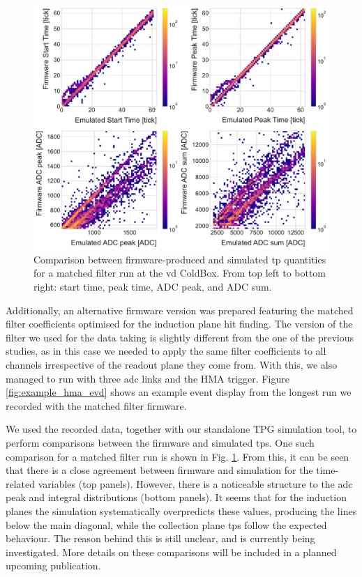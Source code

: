 \begin{figure}[t]
    \centering
    \includegraphics[scale = 0.5]{Images/Matched_Filter/np02_coldbox_tp_comp.pdf}
    \caption[Comparison between firmware-produced and simulated \gls{tp} quantities for a matched filter run at the \gls{vd} ColdBox.]{Comparison between firmware-produced and simulated \gls{tp} quantities for a matched filter run at the \gls{vd} ColdBox. From top left to bottom right: start time, peak time, ADC peak, and ADC sum.}
    \label{fig:vdcoldbox_tp_comp}
\end{figure}

Additionally, an alternative firmware version was prepared featuring the matched filter coefficients optimised for the induction plane hit finding. The version of the filter we used for the data taking is slightly different from the one of the previous studies, as in this case we needed to apply the same filter coefficients to all channels irrespective of the readout plane they come from. With this, we also managed to run with three \gls{adc} links and the HMA trigger. Figure \ref{fig:example_hma_evd} shows an example event display from the longest run we recorded with the matched filter firmware.

We used the recorded data, together with our standalone TPG simulation tool, to perform comparisons between the firmware and simulated \gls{tp}s. One such comparison for a matched filter run is shown in Fig. \ref{fig:vdcoldbox_tp_comp}. From this, it can be seen that there is a close agreement between firmware and simulation for the time-related variables (top panels). However, there is a noticeable structure to the \gls{adc} peak and integral distributions (bottom panels). It seems that for the induction planes the simulation systematically overpredicts these values, producing the lines below the main diagonal, while the collection plane \gls{tp}s follow the expected behaviour. The reason behind this is still unclear, and is currently being investigated. More details on these comparisons will be included in a planned upcoming publication.

